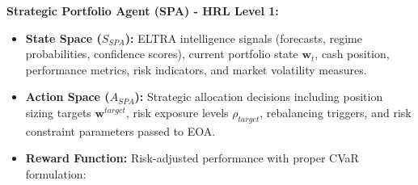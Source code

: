 \documentclass[11pt]{article}
\begin{document}
\textbf{Strategic Portfolio Agent (SPA) - HRL Level 1:}

\begin{itemize}
\item   \textbf{State Space ($S_{SPA}$):} ELTRA intelligence signals (forecasts, regime probabilities, confidence scores), current portfolio state $\mathbf{w}_t$, cash position, performance metrics, risk indicators, and market volatility measures.

\item   \textbf{Action Space ($A_{SPA}$):} Strategic allocation decisions including position sizing targets $\mathbf{w}^{target}$, risk exposure levels $\rho_{target}$, rebalancing triggers, and risk constraint parameters passed to EOA.

\item   \textbf{Reward Function:} Risk-adjusted performance with proper CVaR formulation:
\end{itemize}
\end{document}
